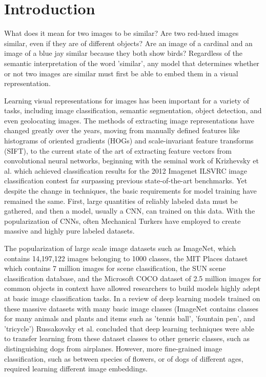 
\section{Introduction}
What does it mean for two images to be similar? Are two red-hued images similar, even if they are of different objects? Are an image of a cardinal and an image of a blue jay similar because they both show birds? Regardless of the semantic interpretation of the word 'similar', any model that determines whether or not two images are similar must first be able to embed them in a visual representation.

Learning visual representations for images has been important for a variety of tasks, including image classification, semantic segmentation, object detection, and even geolocating images. The methods of extracting image representations have changed greatly over the years, moving from manually defined features like histograms of oriented gradients (HOGs) and scale-invariant feature transforms (SIFT)\cite{lowe1999object}\cite{dalal2005histograms}, to the current state of the art of extracting feature vectors from convolutional neural networks, beginning with the seminal work of Krizhevsky et al. which achieved classification results for the 2012 Imagenet ILSVRC image classification contest far surpassing previous state-of-the-art benchmarks\cite{krizhevsky2012imagenet}. Yet despite the change in techniques, the basic requirements for model training have remained the same. First, large quantities of reliably labeled data must be gathered, and then a model, usually a CNN, can trained on this data. With the popularization of CNNs, often Mechanical Turkers have employed to create massive and highly pure labeled datasets.

The popularization of large scale image datasets such as ImageNet, which contains 14,197,122 images belonging to 1000 classes\cite{deng2009imagenet}, the MIT Places dataset which contains 7 million images for scene classification\cite{zhou2014learning}, the SUN scene classification database\cite{xiao2010sun}, and the Microsoft COCO dataset of 2.5 million images for common objects in context\cite{lin2014microsoft} have allowed researchers to build models highly adept at basic image classification tasks\cite{russakovsky2013detecting}. In a review of deep learning models trained on these massive datasets with many basic image classes (ImageNet contains classes for many animals and plants and items such as 'tennis ball', 'fountain pen', and 'tricycle') Russakovsky et al. concluded that deep learning techniques were able to transfer learning from these dataset classes to other generic classes, such as distinguishing dogs from airplanes.\cite{russakovsky2013detecting} However, more fine-grained image classification, such as between species of flowers, or of dogs of different ages, required learning different image embeddings.

